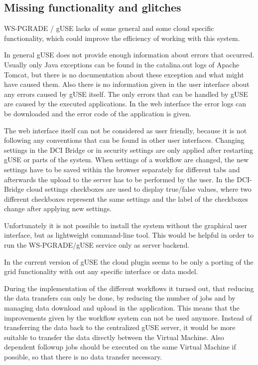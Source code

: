 \subsection{Missing functionality and glitches}\label{missing}

WS-PGRADE / gUSE lacks of some general and some cloud specific functionality, which could improve the efficiency of working with this system.

In general gUSE does not provide enough information about errors that occurred.
Usually only Java exceptions can be found in the catalina.out logs of Apache Tomcat, but there is no documentation about these exception and what might have caused them.
Also there is no information given in the user interface about any errors caused by gUSE itself.
The only errors that can be handled by gUSE are caused by the executed applications.
In the web interface the error logs can be downloaded and the error code of the application is given.

The web interface itself can not be considered as user friendly, because it is not following any conventions that can be found in other user interfaces.
Changing settings in the DCI Bridge or in security settings are only applied after restarting gUSE or parts of the system.
When settings of a workflow are changed, the new settings have to be saved within the browser separately for different tabs and afterwards the upload to the server has to be performed by the user.
In the DCI-Bridge cloud settings checkboxes are used to display true/false values, where two different checkboxes represent the same settings and the label of the checkboxes change after applying new settings.

Unfortunately it is not possible to install the system without the graphical user interface, but as lightweight command-line tool.
This would be helpful in order to run the WS-PGRADE/gUSE service only as server backend.

In the current version of gUSE the cloud plugin seems to be only a porting of the grid functionality with out any specific interface or data model.

During the implementation of the different workflows it turned out, that reducing the data transfers can only be done, by reducing the number of jobs and by managing data download and upload in the application.
This means that the improvements given by the workflow system can not be used anymore.
Instead of transferring the data back to the centralized gUSE server, it would be more suitable to transfer the data directly between the Virtual Machine.
Also dependent followup jobs should be executed on the same Virtual Machine if possible, so that there is no data transfer necessary.


